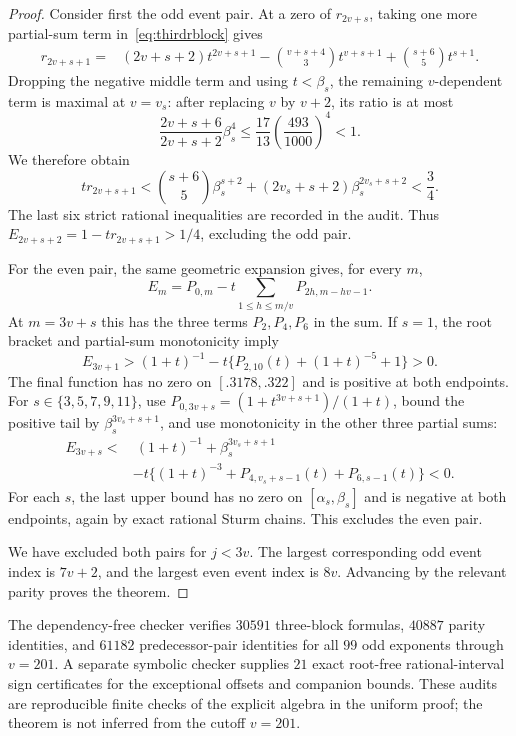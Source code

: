 \documentclass[11pt]{article}
\theoremstyle{remark}
\numberwithin{equation}{section}
\begin{document}
\begin{proof}
Consider first the odd event pair.  At a zero of $r_{2v+s}$, taking one more
partial-sum term in~\eqref{eq:thirdrblock} gives
\begin{align*}
 r_{2v+s+1}={}&(2v+s+2)t^{2v+s+1}
 -{v+s+4\choose3}t^{v+s+1}
 +{s+6\choose5}t^{s+1}.
\end{align*}
Dropping the negative middle term and using $t<\beta_s$, the remaining
$v$-dependent term is maximal at $v=v_s$: after replacing $v$ by $v+2$, its
ratio is at most
\[
 \frac{2v+s+6}{2v+s+2}\beta_s^4
 \le\frac{17}{13}\left(\frac{493}{1000}\right)^4<1.
\]
We therefore obtain
\[
 t r_{2v+s+1}<
 {s+6\choose5}\beta_s^{s+2}
 +(2v_s+s+2)\beta_s^{2v_s+s+2}<\frac34.
\]
The last six strict rational inequalities are recorded in the audit.  Thus
$E_{2v+s+2}=1-t r_{2v+s+1}>1/4$, excluding the odd pair.

For the even pair, the same geometric expansion gives, for every $m$,
\begin{equation}\label{eq:evenpartialblocks}
 E_m=P_{0,m}-t\sum_{1\le h\le m/v}P_{2h,m-hv-1}.
\end{equation}
At $m=3v+s$ this has the three terms $P_2,P_4,P_6$ in the sum.  If $s=1$,
the root bracket and partial-sum monotonicity imply
\[
 E_{3v+1}>(1+t)^{-1}
 -t\{P_{2,10}(t)+(1+t)^{-5}+1\}>0.
\]
The final function has no zero on $[.3178,.322]$ and is positive at both
endpoints.  For $s\in\{3,5,7,9,11\}$, use
$P_{0,3v+s}=(1+t^{3v+s+1})/(1+t)$, bound the positive tail by
$\beta_s^{3v_s+s+1}$, and use monotonicity in the other three partial sums:
\begin{align*}
 E_{3v+s}<&\ (1+t)^{-1}+\beta_s^{3v_s+s+1}\\
 &-t\{(1+t)^{-3}+P_{4,v_s+s-1}(t)+P_{6,s-1}(t)\}<0.
\end{align*}
For each $s$, the last upper bound has no zero on
$[\alpha_s,\beta_s]$ and is negative at both endpoints, again by exact
rational Sturm chains.  This excludes the even pair.

We have excluded both pairs for $j<3v$.  The largest corresponding odd event
index is $7v+2$, and the largest even event index is $8v$.  Advancing by the
relevant parity proves the theorem.
\end{proof}

The dependency-free checker verifies $30591$ three-block formulas,
$40887$ parity identities, and $61182$ predecessor-pair identities for all
$99$ odd exponents through $v=201$.  A separate symbolic checker supplies
$21$ exact root-free rational-interval sign certificates for the exceptional
offsets and companion bounds.  These audits are reproducible finite checks of
the explicit algebra in the uniform proof; the theorem is not inferred from
the cutoff $v=201$.
\end{document}
